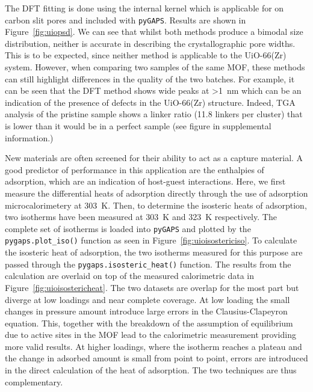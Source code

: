 The DFT fitting is done using the internal kernel
which is applicable for  on carbon slit pores and included with \texttt{pyGAPS}. 
Results are shown in Figure~\ref{fig:uiopsd}. We can see that whilst both methods
produce a bimodal size distribution, neither is accurate in describing the crystallographic pore
widths. This is to be expected, since neither method is applicable to the UiO-66(Zr)
system. However, when comparing two samples of the same MOF, these methods can still
highlight differences in the quality of the two batches. For example, it can be seen
that the DFT method shows wide peaks at >\SI{1}{\nano\meter}
which can be an indication of the presence of defects in the UiO-66(Zr) structure.
Indeed, TGA analysis of the pristine sample shows a linker ratio (11.8 linkers per cluster)
that is lower than it would be in a perfect sample (see figure in supplemental information.) 


New materials are often screened for their ability to act as a  capture material. 
A good predictor of performance 
in this application are the enthalpies of adsorption, which are an indication of
host-guest interactions. Here, we first measure the differential heats of adsorption
directly through the use of adsorption microcalorimetery at \SI{303}{\kelvin}. 
Then, to determine the isosteric heats of adsorption,
two isotherms have been measured at \SI{303}{\kelvin} and \SI{323}{\kelvin} respectively. 
The complete set of isotherms is loaded into \texttt{pyGAPS} and plotted by the 
\lstinline{pygaps.plot_iso()} function as seen in Figure~\ref{fig:uioisostericiso}. 
To calculate the isosteric heat
of adsorption, the two isotherms measured for this purpose are passed through the 
\lstinline{pygaps.isosteric_heat()} function. The results from the calculation are overlaid 
on top of the measured calorimetric data in 
Figure~\ref{fig:uioisostericheat}. The two datasets are
overlap for the most part but diverge at low loadings and near complete coverage.
At low loading the small changes in pressure amount introduce large errors in the 
Clausius-Clapeyron equation. This, together with the breakdown of the 
assumption of equilibrium due to active sites in the MOF lead to the calorimetric
measurement providing more valid results. At higher loadings, where the isotherm reaches
a plateau and the change in adsorbed amount is small from point to point, errors are
introduced in the direct calculation of the heat of adsorption. The two techniques are thus 
complementary.  

